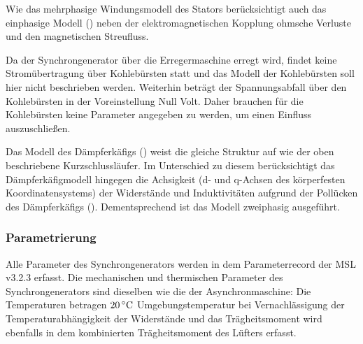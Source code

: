 Wie das mehrphasige Windungsmodell des Stators
berücksichtigt auch das einphasige Modell () neben der elektromagnetischen
Kopplung ohmsche Verluste und den magnetischen Streufluss.

Da der Synchrongenerator über die Erregermaschine erregt wird, findet
keine Stromübertragung über Kohlebürsten statt und das Modell der
Kohlebürsten soll hier nicht beschrieben werden. Weiterhin beträgt der
Spannungsabfall über den Kohlebürsten in der Voreinstellung Null Volt.
Daher brauchen für die Kohlebürsten keine Parameter angegeben zu werden,
um einen Einfluss auszuschließen.

Das Modell des Dämpferkäfigs () weist die gleiche Struktur auf
wie der oben beschriebene Kurzschlussläufer. Im Unterschied zu diesem
berücksichtigt das Dämpferkäfigmodell hingegen die Achsigkeit (d- und
q-Achsen des körperfesten Koordinatensystems) der Widerstände und
Induktivitäten aufgrund der Pollücken des Dämpferkäfigs
(\cite[S. 194]{kralModelicaObjektorientierteModellbildung2019}).
Dementsprechend ist das Modell zweiphasig ausgeführt.

\subsubsection{Parametrierung}\label{parametrierung-SG}

Alle Parameter des Synchrongenerators werden in dem Parameterrecord
der MSL v3.2.3 erfasst. Die mechanischen und thermischen Parameter des
Synchrongenerators sind dieselben wie die der Asynchronmaschine: Die
Temperaturen betragen \(\unit[20]{^\circ C}\) Umgebungstemperatur bei
Vernachlässigung der Temperaturabhängigkeit der Widerstände und das
Trägheitsmoment wird ebenfalls in dem kombinierten Trägheitsmoment des
Lüfters erfasst.


